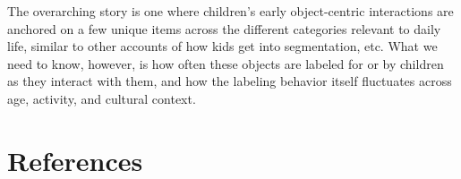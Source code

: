 \documentclass[10pt, letterpaper]{article}
\begin{document}
The overarching story is one where children's early object-centric
interactions are anchored on a few unique items across the different
categories relevant to daily life, similar to other accounts of how kids
get into segmentation, etc. What we need to know, however, is how often
these objects are labeled for or by children as they interact with them,
and how the labeling behavior itself fluctuates across age, activity,
and cultural context.

\hypertarget{references}{%
\section{References}\label{references}}

\setlength{\parindent}{-0.1in} 
\setlength{\leftskip}{0.125in}

\noindent
\end{document}
